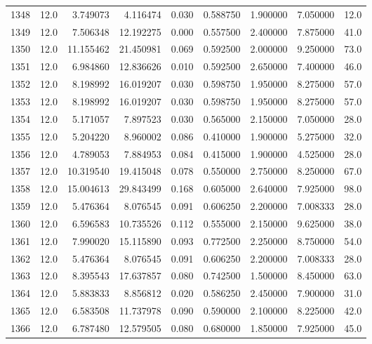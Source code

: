 \begin{tabular}{lrrrrrrrr}
1348 &   12.0 &   3.749073 &   4.116474 &  0.030 &  0.588750 &  1.900000 &   7.050000 &   12.0 \\
1349 &   12.0 &   7.506348 &  12.192275 &  0.000 &  0.557500 &  2.400000 &   7.875000 &   41.0 \\
1350 &   12.0 &  11.155462 &  21.450981 &  0.069 &  0.592500 &  2.000000 &   9.250000 &   73.0 \\
1351 &   12.0 &   6.984860 &  12.836626 &  0.010 &  0.592500 &  2.650000 &   7.400000 &   46.0 \\
1352 &   12.0 &   8.198992 &  16.019207 &  0.030 &  0.598750 &  1.950000 &   8.275000 &   57.0 \\
1353 &   12.0 &   8.198992 &  16.019207 &  0.030 &  0.598750 &  1.950000 &   8.275000 &   57.0 \\
1354 &   12.0 &   5.171057 &   7.897523 &  0.030 &  0.565000 &  2.150000 &   7.050000 &   28.0 \\
1355 &   12.0 &   5.204220 &   8.960002 &  0.086 &  0.410000 &  1.900000 &   5.275000 &   32.0 \\
1356 &   12.0 &   4.789053 &   7.884953 &  0.084 &  0.415000 &  1.900000 &   4.525000 &   28.0 \\
1357 &   12.0 &  10.319540 &  19.415048 &  0.078 &  0.550000 &  2.750000 &   8.250000 &   67.0 \\
1358 &   12.0 &  15.004613 &  29.843499 &  0.168 &  0.605000 &  2.640000 &   7.925000 &   98.0 \\
1359 &   12.0 &   5.476364 &   8.076545 &  0.091 &  0.606250 &  2.200000 &   7.008333 &   28.0 \\
1360 &   12.0 &   6.596583 &  10.735526 &  0.112 &  0.555000 &  2.150000 &   9.625000 &   38.0 \\
1361 &   12.0 &   7.990020 &  15.115890 &  0.093 &  0.772500 &  2.250000 &   8.750000 &   54.0 \\
1362 &   12.0 &   5.476364 &   8.076545 &  0.091 &  0.606250 &  2.200000 &   7.008333 &   28.0 \\
1363 &   12.0 &   8.395543 &  17.637857 &  0.080 &  0.742500 &  1.500000 &   8.450000 &   63.0 \\
1364 &   12.0 &   5.883833 &   8.856812 &  0.020 &  0.586250 &  2.450000 &   7.900000 &   31.0 \\
1365 &   12.0 &   6.583508 &  11.737978 &  0.090 &  0.590000 &  2.100000 &   8.225000 &   42.0 \\
1366 &   12.0 &   6.787480 &  12.579505 &  0.080 &  0.680000 &  1.850000 &   7.925000 &   45.0 \\

\end{tabular}
